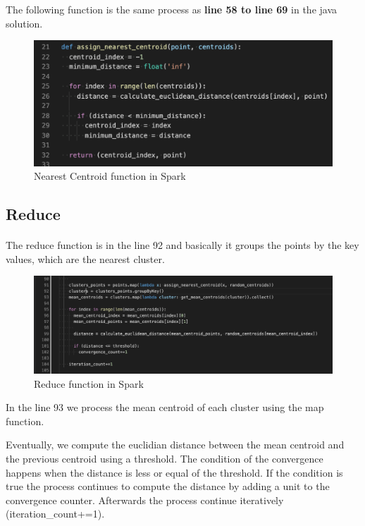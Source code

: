 \documentclass{book}
\begin{document}
    The following function is the same process as \textbf{line 58 to line 69} in the java solution. 

    \begin{figure}[H]
        \includegraphics[width=12cm]{code/nearest_centroid}
        \centering
        \caption{Nearest Centroid function in Spark}
    \end{figure}

    \subsection{Reduce}
    \paragraph{}

    The reduce function is in the line 92 and basically it groups the points by the key values, which are the nearest cluster. 
    
    \begin{figure}[H]
        \includegraphics[width=12cm]{code/cluster_points}
        \centering
        \caption{Reduce function in Spark}
    \end{figure}

    In the line 93 we process the mean centroid of each cluster using the map function.  

    Eventually, we compute the euclidian distance between the mean centroid and the previous centroid using a threshold. The condition of the convergence happens when the distance is less or equal of the threshold. If the condition is true the process continues to compute the distance by adding a unit to the convergence counter. Afterwards the process continue iteratively (iteration\_count+=1). 
\end{document}
